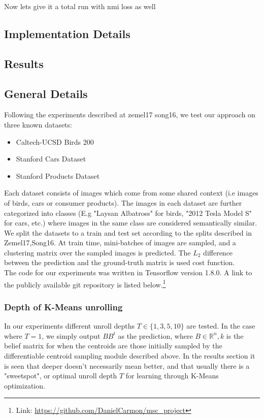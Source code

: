 Now lets give it a total run with nmi loss as well

\subsection{Implementation Details}
\subsection{Results}
\subsection{General Details}
Following the experiments described at zemel17 song16, we test our approach on three known datasets:\\
\begin{itemize}
\item Caltech-UCSD Birds 200 \cite{WahCUB_200_2011}
\item Stanford Cars Dataset
\item Stanford Products Dataset
\end{itemize}
Each dataset consists of images which come from some shared context (i.e images of birds, cars or consumer products). The images in each dataset are further categorized into classes (E.g "Laysan Albatross" for birds, "2012 Tesla Model S" for cars, etc.) where images in the same class are considered semantically similar.
We split the datasets to a train and test set according to the splits described in Zemel17,Song16. At train time, mini-batches of images are sampled, and a clustering matrix over the sampled images is predicted. The $L_2$ difference between the prediction and the ground-truth matrix is used cost function.\\
The code for our experiments was written in Tensorflow \cite{greenwade93} version 1.8.0. A link to the publicly available git repository is listed below.\footnote{Link: \url{https://github.com/DanielCarmon/msc_project}}
\subsubsection{Depth of K-Means unrolling}
In our experiments different unroll depths $T\in\{1,3,5,10\}$ are tested. In the case where $T=1$, we simply output $BB^t$ as the prediction, where $B\in\mathbb{R}^n,k$ is the belief matrix for when the centroids are those initially sampled by the differentiable centroid sampling module described above. 
In the results section it is seen that deeper doesn't necessarily mean better, and that usually there is a "sweetspot", or optimal unroll depth $T$ for learning through K-Means optimization.

